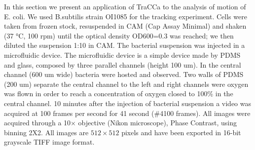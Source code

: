 \documentclass[conference]{IEEEtran}
\begin{document}
In this section we present an application of TraCCa to the analysis of motion of E. coli.
We used B.subtilis strain OI1085 for the tracking experiment. Cells were taken from frozen stock, resuspended in CAM (Cap Assay Minimal) and shaken  (37 °C, 100 rpm) until the optical density OD600=0.3 was reached; we then diluted the suspension 1:10 in CAM. The bacterial suspension was injected in a microfluidic device. The microfluidic device is a simple device made by PDMS and glass, composed by three parallel channels (height 100 um). In the central channel (600 um wide) bacteria were hosted and observed. Two  walls of PDMS (200 um) separate the central channel to the left and right channels were oxygen was flown in order to reach a concentration of oxygen closed to 100\% in the central channel. 10 minutes after the injection of bacterial suspension a video was acquired at 100 frames per second for 41 second (\#4100 frames). All images were acquired through a 10$\times$ objective (Nikon microscope), Phase Contrast, using binning 2X2.
All images are $512 \times 512$ pixels and have been exported in 16-bit grayscale TIFF image format.
\end{document}

